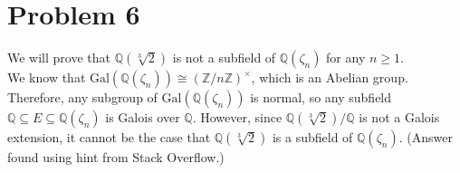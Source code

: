 \documentclass[10pt]{extarticle}
\newcommand{\Q}{\mathbb{Q}}
\newcommand{\Z}{\mathbb{Z}}
\begin{document}
  \section{Problem 6}%
  We will prove that $\Q(\sqrt[3]{2})$ is not a subfield of $\Q(\zeta_n)$ for any $n\geq 1$.\\

  We know that $\text{Gal}(\Q(\zeta_n))\cong \left(\Z/n\Z\right)^{\times}$, which is an Abelian group. Therefore, any subgroup of $\text{Gal}\left(\Q(\zeta_n)\right)$ is normal, so any subfield $\Q \subseteq E\subseteq \Q(\zeta_n)$ is Galois over $\Q$. However, since $\Q(\sqrt[3]{2})/\Q$ is not a Galois extension, it cannot be the case that $\Q(\sqrt[3]{2})$ is a subfield of $\Q(\zeta_n)$. (Answer found using hint from Stack Overflow.)
\end{document}
